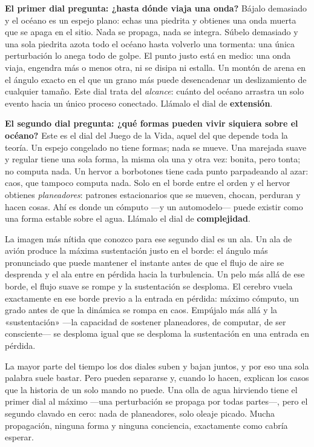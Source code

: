 \documentclass[11pt, twoside, openright]{book}
\begin{document}
\textbf{El primer dial pregunta: ¿hasta dónde viaja una onda?} Bájalo demasiado y el océano es un espejo plano: echas una piedrita y obtienes una onda muerta que se apaga en el sitio. Nada se propaga, nada se integra. Súbelo demasiado y una sola piedrita azota todo el océano hasta volverlo una tormenta: una única perturbación lo anega todo de golpe. El punto justo está en medio: una onda viaja, engendra más o menos otra, ni se disipa ni estalla. Un montón de arena en el ángulo exacto en el que un grano más puede desencadenar un deslizamiento de cualquier tamaño. Este dial trata del \textit{alcance}: cuánto del océano arrastra un solo evento hacia un único proceso conectado. Llámalo el dial de \textbf{extensión}.

\textbf{El segundo dial pregunta: ¿qué formas pueden vivir siquiera sobre el océano?} Este es el dial del Juego de la Vida, aquel del que depende toda la teoría. Un espejo congelado no tiene formas; nada se mueve. Una marejada suave y regular tiene una sola forma, la misma ola una y otra vez: bonita, pero tonta; no computa nada. Un hervor a borbotones tiene cada punto parpadeando al azar: caos, que tampoco computa nada. Solo en el borde entre el orden y el hervor obtienes \textit{planeadores}: patrones estacionarios que se mueven, chocan, perduran y hacen cosas. Ahí es donde un cómputo ---y un automodelo--- puede existir como una forma estable sobre el agua. Llámalo el dial de \textbf{complejidad}.

La imagen más nítida que conozco para ese segundo dial es un ala. Un ala de avión produce la máxima sustentación justo en el borde: el ángulo más pronunciado que puede mantener el instante antes de que el flujo de aire se desprenda y el ala entre en pérdida hacia la turbulencia. Un pelo más allá de ese borde, el flujo suave se rompe y la sustentación se desploma. El cerebro vuela exactamente en ese borde previo a la entrada en pérdida: máximo cómputo, un grado antes de que la dinámica se rompa en caos. Empújalo más allá y la «sustentación» ---la capacidad de sostener planeadores, de computar, de ser consciente--- se desploma igual que se desploma la sustentación en una entrada en pérdida.

La mayor parte del tiempo los dos diales suben y bajan juntos, y por eso una sola palabra suele bastar. Pero pueden separarse y, cuando lo hacen, explican los casos que la historia de un solo mando no puede. Una olla de agua hirviendo tiene el primer dial al máximo ---una perturbación se propaga por todas partes---, pero el segundo clavado en cero: nada de planeadores, solo oleaje picado. Mucha propagación, ninguna forma y ninguna conciencia, exactamente como cabría esperar.
\end{document}
